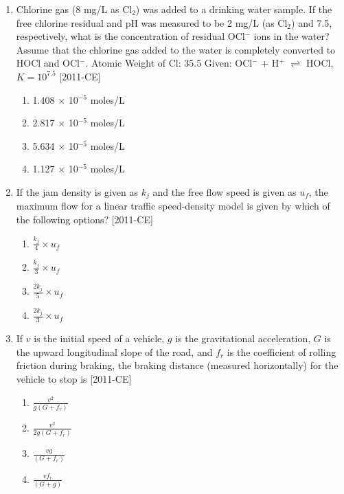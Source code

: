 \documentclass[journal,12pt,onecolumn]{IEEEtran}
\theoremstyle{remark}
\begin{document}
\begin{enumerate}
    \item Chlorine gas (8 mg/L as Cl$_2$) was added to a drinking water sample. If the free chlorine residual and pH was measured to be 2 mg/L (as Cl$_2$) and 7.5, respectively, what is the concentration of residual OCl$^-$ ions in the water? Assume that the chlorine gas added to the water is completely converted to HOCl and OCl$^-$. Atomic Weight of Cl: 35.5 
    Given: OCl$^-$ + H$^+$ $\rightleftharpoons$ HOCl,   $K = 10^{7.5}$ \hfill{[2011-CE]}
    \begin{enumerate}
        \item 1.408 $\times$ 10$^{-5}$ moles/L
        \item 2.817 $\times$ 10$^{-5}$ moles/L
        \item 5.634 $\times$ 10$^{-5}$ moles/L
        \item 1.127 $\times$ 10$^{-5}$ moles/L
    \end{enumerate}

    \item If the jam density is given as $k_j$ and the free flow speed is given as $u_f$, the maximum flow for a linear traffic speed-density model is given by which of the following options? \hfill{[2011-CE]}
    \begin{enumerate}
        \item $\frac{k_j}{4} \times u_f$
        \item $\frac{k_j}{3} \times u_f$
        \item $\frac{2k_j}{5} \times u_f$
        \item $\frac{2k_j}{3} \times u_f$
    \end{enumerate}

    \item If $v$ is the initial speed of a vehicle, $g$ is the gravitational acceleration, $G$ is the upward longitudinal slope of the road, and $f_r$ is the coefficient of rolling friction during braking, the braking distance (measured horizontally) for the vehicle to stop is \hfill{[2011-CE]}

    \begin{enumerate}
        \item $\frac{v^2}{g(G + f_r)}$
        \item $\frac{v^2}{2g(G + f_r)}$
        \item $\frac{vg}{(G + f_r)}$
        \item $\frac{vf_r}{(G + g)}$
    \end{enumerate}


\end{enumerate}
\end{document}
